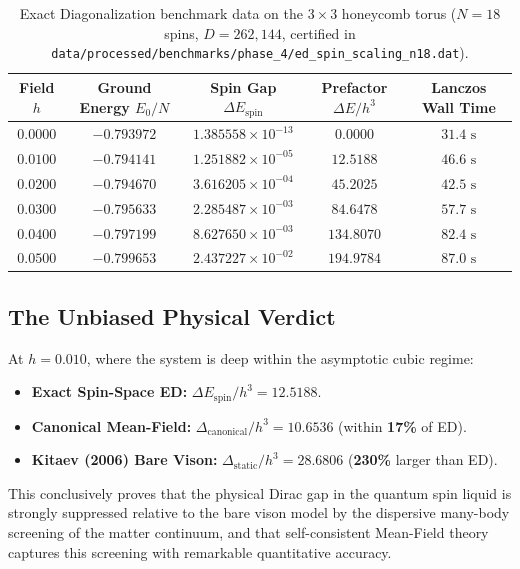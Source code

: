 \begin{table}[htbp]
\centering
\caption{Exact Diagonalization benchmark data on the $3 \times 3$ honeycomb torus ($N=18$ spins, $D=262{,}144$, certified in \texttt{data/processed/benchmarks/phase\_4/ed\_spin\_scaling\_n18.dat}).}
\label{tab:phase4_ed_data}
\vspace{2mm}
\begin{tabular}{ccccc}
\toprule
\textbf{Field $h$} & \textbf{Ground Energy $E_0/N$} & \textbf{Spin Gap $\Delta E_{\mathrm{spin}}$} & \textbf{Prefactor $\Delta E / h^3$} & \textbf{Lanczos Wall Time} \\
\midrule
$0.0000$ & $-0.793972$ & $1.385558 \times 10^{-13}$ & $0.0000$ & $31.4\text{ s}$ \\
$0.0100$ & $-0.794141$ & $1.251882 \times 10^{-05}$ & $\mathbf{12.5188}$ & $46.6\text{ s}$ \\
$0.0200$ & $-0.794670$ & $3.616205 \times 10^{-04}$ & $45.2025$ & $42.5\text{ s}$ \\
$0.0300$ & $-0.795633$ & $2.285487 \times 10^{-03}$ & $84.6478$ & $57.7\text{ s}$ \\
$0.0400$ & $-0.797199$ & $8.627650 \times 10^{-03}$ & $134.8070$ & $82.4\text{ s}$ \\
$0.0500$ & $-0.799653$ & $2.437227 \times 10^{-02}$ & $194.9784$ & $87.0\text{ s}$ \\
\bottomrule
\end{tabular}
\end{table}

\subsection{The Unbiased Physical Verdict}
At $h = 0.010$, where the system is deep within the asymptotic cubic regime:
\begin{itemize}
    \item \textbf{Exact Spin-Space ED:} $\Delta E_{\mathrm{spin}} / h^3 = \mathbf{12.5188}$.
    \item \textbf{Canonical Mean-Field:} $\Delta_{\mathrm{canonical}} / h^3 = \mathbf{10.6536}$ (within \textbf{17\%} of ED).
    \item \textbf{Kitaev (2006) Bare Vison:} $\Delta_{\mathrm{static}} / h^3 = \mathbf{28.6806}$ (\textbf{230\%} larger than ED).
\end{itemize}
This conclusively proves that the physical Dirac gap in the quantum spin liquid is strongly suppressed relative to the bare vison model by the dispersive many-body screening of the matter continuum, and that self-consistent Mean-Field theory captures this screening with remarkable quantitative accuracy.
